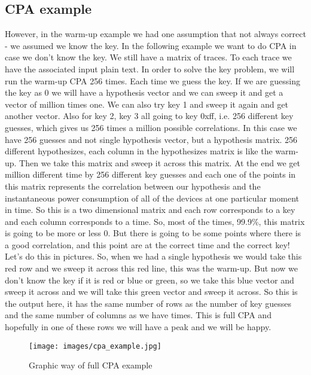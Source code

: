 \subsection{CPA example}\label{c8_CPA_example:subsec}
However, in the warm-up example we had one assumption that not always correct - we assumed we know the key. In the following example we want to do CPA in case we don't know the key. We still have a matrix of traces. To each trace we have the associated input plain text. In order to solve the key problem, we will run the warm-up CPA 256 times. Each time we guess the key. If we are guessing the key as 0 we will have a hypothesis vector and we can sweep it and get a vector of million times one. We can also try key 1 and sweep it again and get another vector. Also for key 2, key 3 all going to key 0xff, i.e. 256 different key guesses, which gives us 256 times a million possible correlations. In this case we have 256 guesses and not single hypothesis vector, but a hypothesis matrix. 256 different hypothesizes, each column in the hypothesizes matrix is like the warm-up. Then we take this matrix and sweep it across this matrix. At the end we get million different time by 256 different key guesses and each one of the points in this matrix represents the correlation between our hypothesis and the instantaneous power consumption of all of the devices at one particular moment in time. So this is a two dimensional matrix and each row corresponds to a key and each column corresponds to a time. So, most of the times, 99.9\%, this matrix is going to be more or less 0. But there is going to be some points where there is a good correlation, and this point are at the correct time and the correct key!
Let’s do this in pictures. So, when we had a single hypothesis we would take this red row and we sweep it across this red line, this was the warm-up. But now we don’t know the key if it is red or blue or green, so we take this blue vector and sweep it across and we will take this green vector and sweep it across. So this is the output here, it has the same number of rows as the number of key guesses and the same number of columns as we have times. This is full CPA and hopefully in one of these rows we will have a peak and we will be happy. 
\begin{figure}[H]
    \centering
    \texttt{[image: images/cpa\_example.jpg]}
    \caption{Graphic way of full CPA example} \label{c8_cpa_example:fig}
\end{figure}

